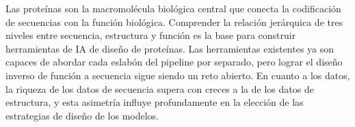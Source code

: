 Las proteínas son la macromolécula biológica central que conecta la codificación de secuencias con la función biológica. Comprender la relación jerárquica de tres niveles entre secuencia, estructura y función es la base para construir herramientas de IA de diseño de proteínas. Las herramientas existentes ya son capaces de abordar cada eslabón del pipeline por separado, pero lograr el diseño inverso de función a secuencia sigue siendo un reto abierto. En cuanto a los datos, la riqueza de los datos de secuencia supera con creces a la de los datos de estructura, y esta asimetría influye profundamente en la elección de las estrategias de diseño de los modelos.
